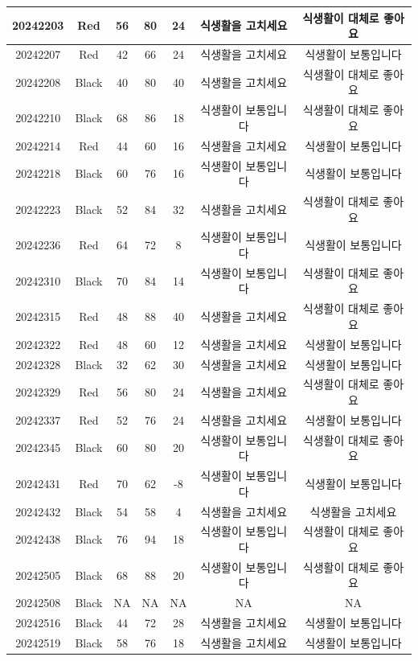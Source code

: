 \documentclass[
]{book}
\begin{document}
\begin{tabular}{c|c|c|c|c|c|c}
\hline
20242203 & Red & 56 & 80 & 24 & 식생활을 고치세요 & 식생활이 대체로 좋아요\\
\hline
20242207 & Red & 42 & 66 & 24 & 식생활을 고치세요 & 식생활이 보통입니다\\
\hline
20242208 & Black & 40 & 80 & 40 & 식생활을 고치세요 & 식생활이 대체로 좋아요\\
\hline
20242210 & Black & 68 & 86 & 18 & 식생활이 보통입니다 & 식생활이 대체로 좋아요\\
\hline
20242214 & Red & 44 & 60 & 16 & 식생활을 고치세요 & 식생활이 보통입니다\\
\hline
20242218 & Black & 60 & 76 & 16 & 식생활이 보통입니다 & 식생활이 보통입니다\\
\hline
20242223 & Black & 52 & 84 & 32 & 식생활을 고치세요 & 식생활이 대체로 좋아요\\
\hline
20242236 & Red & 64 & 72 & 8 & 식생활이 보통입니다 & 식생활이 보통입니다\\
\hline
20242310 & Black & 70 & 84 & 14 & 식생활이 보통입니다 & 식생활이 대체로 좋아요\\
\hline
20242315 & Red & 48 & 88 & 40 & 식생활을 고치세요 & 식생활이 대체로 좋아요\\
\hline
20242322 & Red & 48 & 60 & 12 & 식생활을 고치세요 & 식생활이 보통입니다\\
\hline
20242328 & Black & 32 & 62 & 30 & 식생활을 고치세요 & 식생활이 보통입니다\\
\hline
20242329 & Red & 56 & 80 & 24 & 식생활을 고치세요 & 식생활이 대체로 좋아요\\
\hline
20242337 & Red & 52 & 76 & 24 & 식생활을 고치세요 & 식생활이 보통입니다\\
\hline
20242345 & Black & 60 & 80 & 20 & 식생활이 보통입니다 & 식생활이 대체로 좋아요\\
\hline
20242431 & Red & 70 & 62 & -8 & 식생활이 보통입니다 & 식생활이 보통입니다\\
\hline
20242432 & Black & 54 & 58 & 4 & 식생활을 고치세요 & 식생활을 고치세요\\
\hline
20242438 & Black & 76 & 94 & 18 & 식생활이 보통입니다 & 식생활이 대체로 좋아요\\
\hline
20242505 & Black & 68 & 88 & 20 & 식생활이 보통입니다 & 식생활이 대체로 좋아요\\
\hline
20242508 & Black & NA & NA & NA & NA & NA\\
\hline
20242516 & Black & 44 & 72 & 28 & 식생활을 고치세요 & 식생활이 보통입니다\\
\hline
20242519 & Black & 58 & 76 & 18 & 식생활을 고치세요 & 식생활이 보통입니다\\

\end{tabular}
\end{document}
